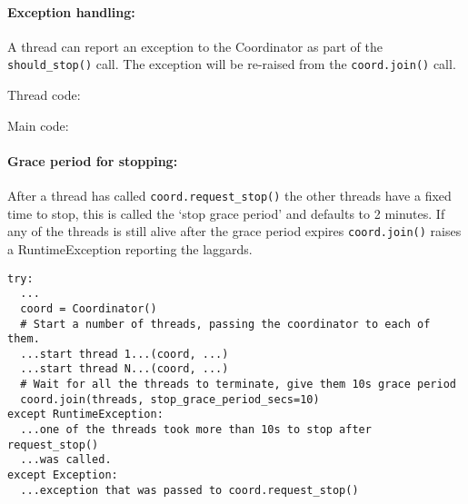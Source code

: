 \paragraph{Exception handling: }\label{exception-handling}

A thread can report an exception to the Coordinator as part of the
\texttt{should\_stop()} call. The exception will be re-raised from the
\texttt{coord.join()} call.

Thread code:

\begin{Shaded}
\begin{Highlighting}[]
\NormalTok{:}
    
 
\end{Highlighting}
\end{Shaded}

Main code:

\begin{Shaded}
\begin{Highlighting}[]
\NormalTok{:}
  \OperatorTok{=} 
 
\end{Highlighting}
\end{Shaded}

\paragraph{Grace period for stopping: }\label{grace-period-for-stopping}

After a thread has called \texttt{coord.request\_stop()} the other
threads have a fixed time to stop, this is called the `stop grace
period' and defaults to 2 minutes. If any of the threads is still alive
after the grace period expires \texttt{coord.join()} raises a
RuntimeException reporting the laggards.

\begin{verbatim}
try:
  ...
  coord = Coordinator()
  # Start a number of threads, passing the coordinator to each of them.
  ...start thread 1...(coord, ...)
  ...start thread N...(coord, ...)
  # Wait for all the threads to terminate, give them 10s grace period
  coord.join(threads, stop_grace_period_secs=10)
except RuntimeException:
  ...one of the threads took more than 10s to stop after request_stop()
  ...was called.
except Exception:
  ...exception that was passed to coord.request_stop()
\end{verbatim}

